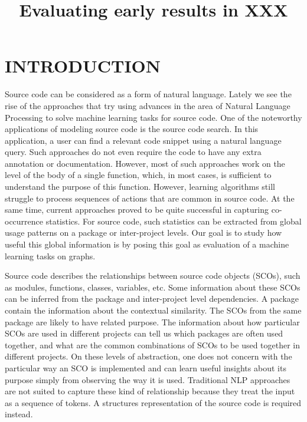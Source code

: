 \documentclass[a4paper,twoside]{article}
\begin{document}
\title{Evaluating early results in XXX}

\author{
}

\keywords{}

\abstract{
}

\onecolumn \maketitle \normalsize \setcounter{footnote}{0} \vfill

\section{\uppercase{Introduction}}
Source code can be considered as a form of natural language. Lately we see the rise of the approaches that try using advances in the area of Natural Language Processing to solve machine learning tasks for source code. One of the noteworthy applications of modeling source code is the source code search. In this application, a user can find a relevant code snippet using a natural language query. Such approaches do not even require the code to have any extra annotation or documentation. However, most of such approaches work on the level of the body of a single function, which, in most cases, is sufficient to understand the purpose of this function. However, learning algorithms still struggle to process sequences of actions that are common in source code. At the same time, current approaches proved to be quite successful in capturing co-occurrence statistics. For source code, such statistics can be extracted from global usage patterns on a package or inter-project levels. Our goal is to study how useful this global information is by posing this goal as evaluation of a machine learning tasks on graphs.
 
Source code describes the relationships between source code objects (SCOs), such as modules, functions, classes, variables, etc. Some information about these SCOs can be inferred from the package and inter-project level dependencies. A package contain the information about the contextual similarity. The SCOs from the same package are likely to have related purpose. The information about how particular SCOs are used in different projects can tell us which packages are often used together, and what are the common combinations of SCOs to be used together in different projects. On these levels of abstraction, one does not concern with the particular way an SCO is implemented and can learn useful insights about its purpose simply from observing the way it is used. Traditional NLP approaches are not suited to capture these kind of relationship because they treat the input as a sequence of tokens. A structures representation of the source code is required instead.
\end{document}
